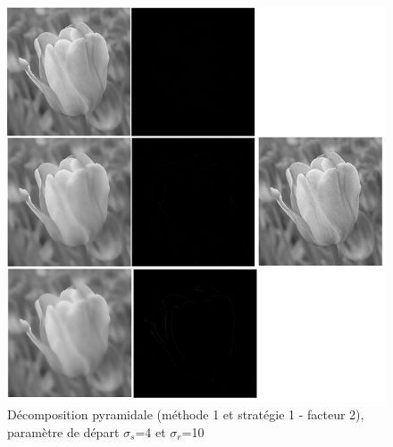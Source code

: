 \documentclass[twoside,UTF8]{EPURapport}
\begin{document}
\begin{figure}[H]
	\begin{center} 
		\includegraphics[]{images/pyramide1_x2__4_10_flower.png} 
	\end{center} 
	\caption{Décomposition pyramidale (méthode 1 et stratégie 1 - facteur 2), paramètre de départ $\sigma_s$=4 et $\sigma_r$=10}
\end{figure}





\end{document}
